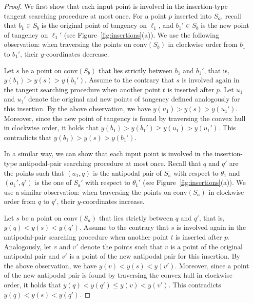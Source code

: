 \documentclass[english,a4paper, cleveref, autoref, thm-restate, nolineno]{socg-lipics-v2021}
\theoremstyle{star}
\theoremstyle{claimstar}
\newcommand{\conv}{\ensuremath{\mathrm{conv}}}
\begin{document}
\begin{proof}
    We first show that each input point is involved in the insertion-type tangent searching procedure at most once.
    For a point $p$ inserted into $S_a$, recall that $b_1 \in S_b$ is the original point of tangency on $\ell_1$, and $b_1' \in S_b$ is the new point of tangency on $\ell_1'$ (see Figure~\ref{fig:insertions}(a)).
    We use the following observation:
    when traversing the points on $\conv(S_b)$ in clockwise order from $b_1$ to $b_1'$, their $y$-coordinates decrease.
    
    Let $s$ be a point on $\conv(S_b)$ that lies strictly between $b_1$ and $b_1'$, that is, $y(b_1) > y(s) > y(b_1')$.
    Assume to the contrary that $s$ is involved again in the tangent searching procedure when another point $t$ is inserted after $p$.
    Let $u_1$ and $u_1'$ denote the original and new points of tangency defined analogously for this insertion.
    By the above observation, we have $y(u_1) > y(s) > y(u_1')$.
    Moreover, since the new point of tangency is found by traversing the convex hull in clockwise order, 
    it holds that $y(b_1) > y(b_1') \ge y(u_1) > y(u_1')$.
    This contradicts that $y(b_1) > y(s) > y(b_1')$.

    In a similar way, we can show that each input point is involved in the insertion-type antipodal-pair searching procedure at most once.
    Recall that $q$ and $q'$ are the points such that $(a_1, q)$ is the antipodal pair of $S_a$ with respect to $\theta_1$ and $(a_1',q')$ is the one of $S_a'$ with respect to $\theta_1'$ (see Figure~\ref{fig:insertions}(a)). 
    We use a similar observation: when traversing the points on $\conv(S_a)$ in clockwise order from $q$ to $q'$, their $y$-coordinates increase.
    
    Let $s$ be a point on $\conv(S_a)$ that lies strictly between $q$ and $q'$, that is, $y(q) < y(s) < y(q')$.
    Assume to the contrary that $s$ is involved again in the antipodal-pair searching procedure when another point $t$ is inserted after $p$.
    Analogously, let $v$ and $v'$ denote the points such that $v$ is a point of the original antipodal pair and $v'$ is a point of the new antipodal pair for this insertion.
    By the above observation, we have $y(v) < y(s) < y(v')$.
    Moreover, since a point of the new antipodal pair is found by traversing the convex hull in clockwise order, 
    it holds that $y(q) < y(q') \le y(v) < y(v')$.
    This contradicts $y(q) < y(s) < y(q')$.
\end{proof}
\end{document}
